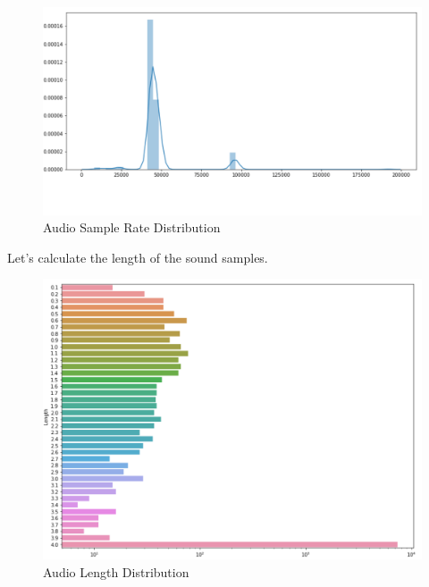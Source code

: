 \begin{Schunk}
\begin{figure}[H]

{\centering \includegraphics[width=1\linewidth]{../images/sampleRate} 

}

\caption[Audio Sample Rate Distribution]{Audio Sample Rate Distribution}\label{fig:sampled}
\end{figure}
\end{Schunk}

Let's calculate the length of the sound samples.

\begin{Schunk}
\begin{figure}[H]

{\centering \includegraphics[width=1\linewidth]{../images/durationOfSoundFiles} 

}

\caption[Audio Length Distribution]{Audio Length Distribution}\label{fig:lengthd}
\end{figure}
\end{Schunk}

